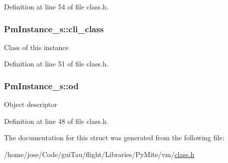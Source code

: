 Definition at line 54 of file class.\-h.

\hypertarget{struct_pm_instance__s_a0fe0e7fa65978e3f0f7268e5bf7ceb07}{
\subsubsection[{cli\-\_\-class}]{ Pm\-Instance\-\_\-s\-::cli\-\_\-class}}\label{struct_pm_instance__s_a0fe0e7fa65978e3f0f7268e5bf7ceb07}
Class of this instance 

Definition at line 51 of file class.\-h.

\hypertarget{struct_pm_instance__s_a8fc0e18aad0c3417991345f33bc3f150}{
\subsubsection[{od}]{ Pm\-Instance\-\_\-s\-::od}}\label{struct_pm_instance__s_a8fc0e18aad0c3417991345f33bc3f150}
Object descriptor 

Definition at line 48 of file class.\-h.



The documentation for this struct was generated from the following file\-:\begin{DoxyCompactItemize}
\item 
/home/jose/\-Code/gui\-Tau/flight/\-Libraries/\-Py\-Mite/vm/\hyperlink{class_8h}{class.\-h}\end{DoxyCompactItemize}
